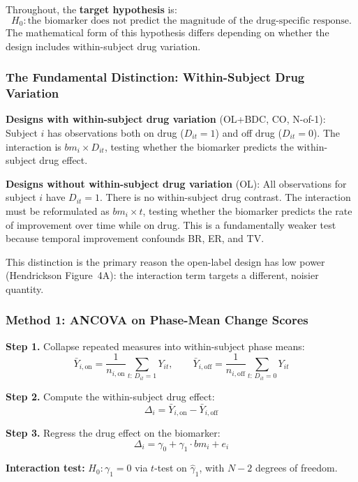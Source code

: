 \documentclass[11pt,letterpaper]{article}
\begin{document}
Throughout, the \textbf{target hypothesis} is:
\[
H_0: \text{the biomarker does not predict the magnitude of the
drug-specific response.}
\]
The mathematical form of this hypothesis differs depending on whether
the design includes within-subject drug variation.

\subsubsection{The Fundamental Distinction: Within-Subject Drug Variation}

\textbf{Designs with within-subject drug variation} (OL+BDC, CO,
N-of-1): Subject $i$ has observations both on drug ($D_{it} = 1$) and
off drug ($D_{it} = 0$). The interaction is $bm_i \times D_{it}$,
testing whether the biomarker predicts the within-subject drug effect.

\textbf{Designs without within-subject drug variation} (OL): All
observations for subject $i$ have $D_{it} = 1$. There is no
within-subject drug contrast. The interaction must be reformulated as
$bm_i \times t$, testing whether the biomarker predicts the rate of
improvement over time while on drug. This is a fundamentally weaker test
because temporal improvement confounds BR, ER, and TV.

This distinction is the primary reason the open-label design has low
power (Hendrickson Figure~4A): the interaction term targets a different,
noisier quantity.

\subsubsection{Method 1: ANCOVA on Phase-Mean Change Scores}

\textbf{Step 1.} Collapse repeated measures into within-subject phase
means:
\[
\bar{Y}_{i,\text{on}} = \frac{1}{n_{i,\text{on}}}
\sum_{t:\, D_{it}=1} Y_{it}, \qquad
\bar{Y}_{i,\text{off}} = \frac{1}{n_{i,\text{off}}}
\sum_{t:\, D_{it}=0} Y_{it}
\]

\textbf{Step 2.} Compute the within-subject drug effect:
\[
\Delta_i = \bar{Y}_{i,\text{on}} - \bar{Y}_{i,\text{off}}
\]

\textbf{Step 3.} Regress the drug effect on the biomarker:
\[
\Delta_i = \gamma_0 + \gamma_1 \cdot bm_i + e_i
\]

\textbf{Interaction test:} $H_0: \gamma_1 = 0$ via $t$-test on
$\hat{\gamma}_1$, with $N - 2$ degrees of freedom.
\end{document}
